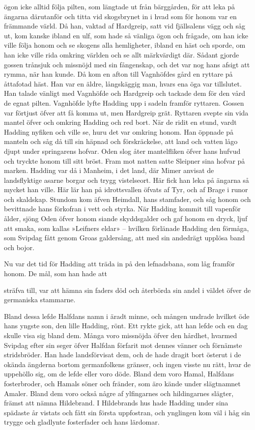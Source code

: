 ögon icke alltid följa pilten, som längtade ut från bärggården, för att
leka på ängarna därutanför och titta vid skogsbrynet in i hvad som för
honom var en främmande värld. Då han, vaktad af Hardgreip, satt vid
fjällsalens vägg och såg ut, kom kanske ibland en ulf, som hade så
vänliga ögon och frågade, om han icke ville följa honom och se skogens
alla hemligheter, ibland en häst och sporde, om han icke ville rida
omkring världen och se allt märkvärdigt där. Sådant gjorde gossen
trånsjuk och missnöjd med sin fångenskap, och det var nog hans afsigt
att rymma, när han kunde. Då kom en afton till Vagnhöfdes gård en
ryttare på åttafotad häst. Han var en äldre, långskäggig man, hvars ena
öga var tillslutet. Han talade vänligt med Vagnhöfde och Hardgreip och
tackade dem för den vård de egnat pilten. Vagnhöfde lyfte Hadding upp i
sadeln framför ryttaren. Gossen var förtjust öfver att få komma ut, men
Hardgreip grät. Ryttaren svepte sin vida mantel öfver och omkring
Hadding och red bort. När de ridit en stund, vardt Hadding nyfiken och
ville se, huru det var omkring honom. Han öppnade på manteln och såg då
till sin häpnad och förskräckelse, att land och vatten lågo djupt under
springarens hofvar. Oden slog åter mantelfliken öfver hans hufvud och
tryckte honom till sitt bröst. Fram mot natten satte Sleipner sina
hofvar på marken. Hadding var då i Manheim, i det land, där Mimer
anvisat de landsflyktige asarne borgar och trygg vistelseort. Här fick
han leka på ängarna så mycket han ville. Här lär han på idrottsvallen
öfvats af Tyr, och af Brage i runor och skaldskap. Stundom kom äfven
Heimdall, hans stamfader, och såg honom och bevittnade hans förkofran i
vett och styrka. När Hadding kommit till vapenför ålder, sjöng Oden
öfver honom siande skyddsgalder och gaf honom en dryck, ljuf att smaka,
som kallas »Leifners eldar» -- hvilken förlänade Hadding den förmåga,
som Svipdag fått genom Groas galdersång, att med sin andedrägt upplösa
band och bojor.

Nu var det tid för Hadding att träda in på den lefnadsbana, som låg
framför honom. De mål, som han hade att

sträfva till, var att hämna sin faders död och återbörda sin andel i
väldet öfver de germaniska stammarne.

Bland dessa lefde Halfdans namn i äradt minne, och mången undrade
hvilket öde hans yngste son, den lille Hadding, rönt. Ett rykte gick,
att han lefde och en dag skulle visa sig bland dem. Många voro missnöjda
öfver den hårdhet, hvarmed Svipdag efter sin seger öfver Halfdan
förfarit mot dennes vänner och förnämste stridsbröder. Han hade
landsförvisat dem, och de hade dragit bort österut i de okända ängderna
bortom germanfolkens gränser, och ingen visste nu rätt, hvar de
uppehöllo sig, om de lefde eller voro döde. Bland dem voro Hamal,
Halfdans fosterbroder, och Hamals söner och fränder, som äro kände under
slägtnamnet Amaler. Bland dem voro också någre af ylfingarnes och
hildingarnes slägter, främst att nämna Hildebrand. I Hildebrands hus
hade Hadding under sina spädaste år vistats och fått sin första
uppfostran, och ynglingen kom väl i håg sin trygge och gladlynte
fosterfader och hans lärdomar.

